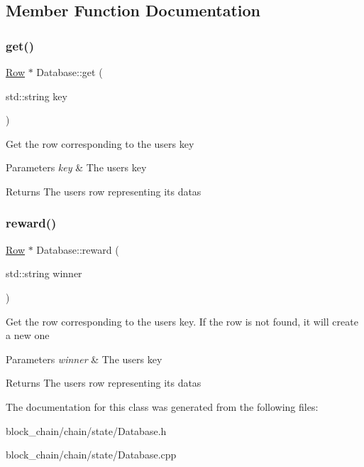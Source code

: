 \subsection{Member Function Documentation}
\mbox{\label{classDatabase_a748f2ce7df893cdb61d8418be907ac72}} 
\subsubsection{\texorpdfstring{get()}{get()}}
{\footnotesize\ttfamily \mbox{\hyperlink{classRow}{Row}} $\ast$ Database\+::get (\begin{DoxyParamCaption}\item[{std\+::string}]{key }\end{DoxyParamCaption})}

Get the row corresponding to the user\textquotesingle{}s key


\begin{DoxyParams}{Parameters}
{\em key} & The users key \\
\hline
\end{DoxyParams}
\begin{DoxyReturn}{Returns}
The user\textquotesingle{}s row representing its datas 
\end{DoxyReturn}
\mbox{\label{classDatabase_a5bdce9dce60e4fdb4f04c7baa023c0b8}} 
\subsubsection{\texorpdfstring{reward()}{reward()}}
{\footnotesize\ttfamily \mbox{\hyperlink{classRow}{Row}} $\ast$ Database\+::reward (\begin{DoxyParamCaption}\item[{std\+::string}]{winner }\end{DoxyParamCaption})}

Get the row corresponding to the user\textquotesingle{}s key. If the row is not found, it will create a new one


\begin{DoxyParams}{Parameters}
{\em winner} & The users key \\
\hline
\end{DoxyParams}
\begin{DoxyReturn}{Returns}
The user\textquotesingle{}s row representing its datas 
\end{DoxyReturn}


The documentation for this class was generated from the following files\+:\begin{DoxyCompactItemize}
\item 
block\+\_\+chain/chain/state/Database.\+h\item 
block\+\_\+chain/chain/state/Database.\+cpp\end{DoxyCompactItemize}
